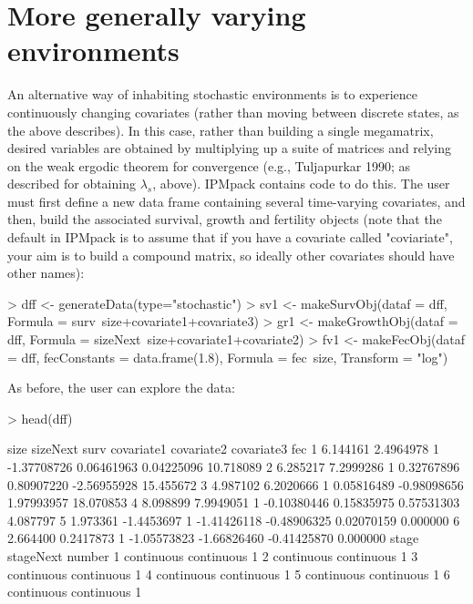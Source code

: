 \documentclass{article}
\begin{document}

\section{More generally varying environments}

An alternative way of inhabiting stochastic environments is to experience continuously changing covariates (rather than moving between discrete states, as the above describes). In this case, rather than building a single megamatrix, desired variables are obtained by multiplying up a suite of matrices and relying on the weak
ergodic theorem for convergence (e.g., Tuljapurkar 1990; as described for obtaining $\lambda_s$, above). IPMpack contains code to do this. The user must first define a new data frame containing several time-varying covariates, and then, build the associated survival, growth and fertility objects (note that the default in IPMpack is to assume that if you have a covariate called "coviariate", your aim is to build a compound matrix, so ideally other covariates should have other names): 
\begin{Schunk}
\begin{Sinput}
> dff <- generateData(type="stochastic")
> sv1 <- makeSurvObj(dataf = dff, 
                            Formula = surv~size+covariate1+covariate3)
> gr1 <- makeGrowthObj(dataf = dff, 
                               Formula = sizeNext~size+covariate1+covariate2)
> fv1 <- makeFecObj(dataf = dff, fecConstants = data.frame(1.8), 
                    Formula = fec~size, Transform = "log")
\end{Sinput}
\end{Schunk}
As before, the user can explore the data: 
\begin{Schunk}
\begin{Sinput}
> head(dff)
\end{Sinput}
\begin{Soutput}
      size   sizeNext surv  covariate1  covariate2  covariate3       fec
1 6.144161  2.4964978    1 -1.37708726  0.06461963  0.04225096 10.718089
2 6.285217  7.2999286    1  0.32767896  0.80907220 -2.56955928 15.455672
3 4.987102  6.2020666    1  0.05816489 -0.98098656  1.97993957 18.070853
4 8.098899  7.9949051    1 -0.10380446  0.15835975  0.57531303  4.087797
5 1.973361 -1.4453697    1 -1.41426118 -0.48906325  0.02070159  0.000000
6 2.664400  0.2417873    1 -1.05573823 -1.66826460 -0.41425870  0.000000
       stage  stageNext number
1 continuous continuous      1
2 continuous continuous      1
3 continuous continuous      1
4 continuous continuous      1
5 continuous continuous      1
6 continuous continuous      1
\end{Soutput}
\end{Schunk}
\end{document}
